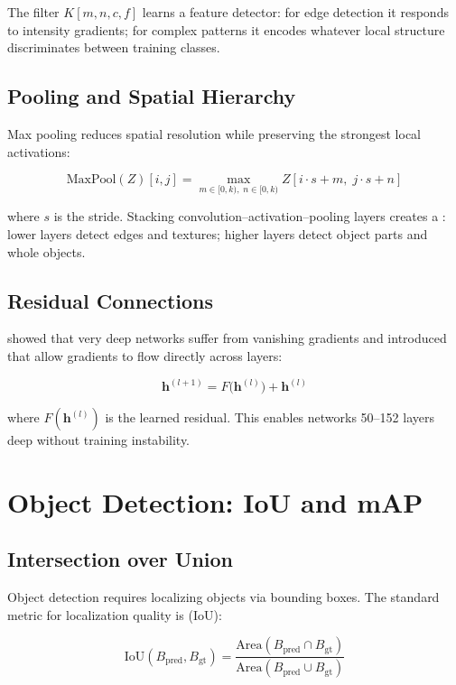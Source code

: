 The filter $K[m,n,c,f]$ learns a feature detector: for edge detection it responds to intensity gradients; for complex patterns it encodes whatever local structure discriminates between training classes.

\subsection{Pooling and Spatial Hierarchy}

Max pooling reduces spatial resolution while preserving the strongest local activations:

\[
\text{MaxPool}(Z)[i, j] = \max_{m \in [0,k),\; n \in [0,k)} Z[i \cdot s + m,\; j \cdot s + n]
\]

where $s$ is the stride. Stacking convolution--activation--pooling layers creates a : lower layers detect edges and textures; higher layers detect object parts and whole objects.

\subsection{Residual Connections}

\textcite{he2016deep} showed that very deep networks suffer from vanishing gradients and introduced  that allow gradients to flow directly across layers:

\[
\mathbf{h}^{(l+1)} = F\bigl(\mathbf{h}^{(l)}\bigr) + \mathbf{h}^{(l)}
\]

where $F(\mathbf{h}^{(l)})$ is the learned residual. This enables networks 50--152 layers deep without training instability.

\section{Object Detection: IoU and mAP}

\subsection{Intersection over Union}

Object detection requires localizing objects via bounding boxes. The standard metric for localization quality is  (IoU):

\[
\text{IoU}(B_\text{pred}, B_\text{gt}) =
  \frac{\text{Area}(B_\text{pred} \cap B_\text{gt})}
       {\text{Area}(B_\text{pred} \cup B_\text{gt})}
\]

